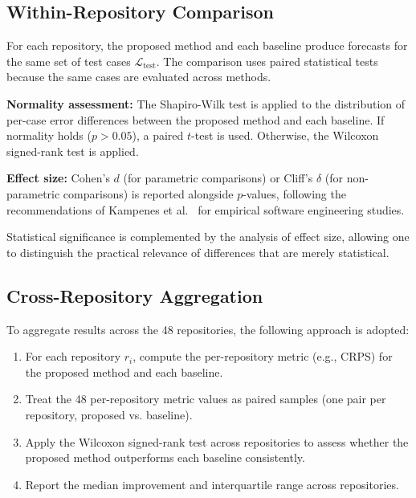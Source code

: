 \subsection{Within-Repository Comparison}
\label{sec:within-repo}

For each repository, the proposed method and each baseline produce 
forecasts for the same set of test cases $\mathcal{L}_{\text{test}}$. 
The comparison uses paired statistical tests because the same cases are 
evaluated across methods.

\textbf{Normality assessment:} The Shapiro-Wilk test is applied to the 
distribution of per-case error differences between the proposed method 
and each baseline. If normality holds ($p > 0.05$), a paired $t$-test 
is used. Otherwise, the Wilcoxon signed-rank test is applied.

\textbf{Effect size:} Cohen's $d$ (for parametric comparisons) or 
Cliff's $\delta$ (for non-parametric comparisons) is reported alongside 
$p$-values, following the recommendations of 
Kampenes et al.~\cite{kampenes2007systematic} for empirical software 
engineering studies.

Statistical significance is complemented by the analysis of effect size, allowing one to distinguish the practical relevance of differences that are merely statistical.

\subsection{Cross-Repository Aggregation}
\label{sec:cross-repo-stats}

To aggregate results across the 48 repositories, the following approach 
is adopted:

\begin{enumerate}
    \item For each repository $r_i$, compute the per-repository metric 
    (e.g., CRPS) for the proposed method and each baseline.
    
    \item Treat the 48 per-repository metric values as paired samples 
    (one pair per repository, proposed vs. baseline).
    
    \item Apply the Wilcoxon signed-rank test across repositories to 
    assess whether the proposed method outperforms each baseline 
    consistently.
    
    \item Report the median improvement and interquartile range across 
    repositories.
\end{enumerate}

